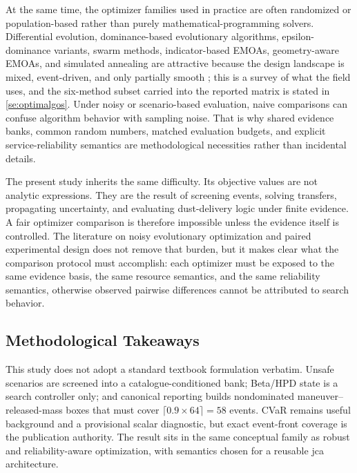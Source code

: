 At the same time, the optimizer families used in practice are often randomized or population-based rather than purely mathematical-programming solvers. Differential evolution, dominance-based evolutionary algorithms, epsilon-dominance variants, swarm methods, indicator-based EMOAs, geometry-aware EMOAs, and simulated annealing are attractive because the design landscape is mixed, event-driven, and only partially smooth \cite{StornPrice1997,deb2002nsgaii,laumanns2002epsilon,coello2002mopso,beume2007smsemoa,panichella2022agemoea2,kirkpatrick1983sa}; this is a survey of what the field uses, and the six-method subset carried into the reported matrix is stated in \cref{se:optimalgos}. Under noisy or scenario-based evaluation, naive comparisons can confuse algorithm behavior with sampling noise. That is why shared evidence banks, common random numbers, matched evaluation budgets, and explicit service-reliability semantics are methodological necessities rather than incidental details.

The present study inherits the same difficulty. Its objective values are not analytic expressions. They are the result of screening events, solving transfers, propagating uncertainty, and evaluating dust-delivery logic under finite evidence. A fair optimizer comparison is therefore impossible unless the evidence itself is controlled. The literature on noisy evolutionary optimization and paired experimental design does not remove that burden, but it makes clear what the comparison protocol must accomplish: each optimizer must be exposed to the same evidence basis, the same resource semantics, and the same reliability semantics, otherwise observed pairwise differences cannot be attributed to search behavior.

\subsection{Methodological Takeaways}
This study does not adopt a standard textbook formulation verbatim. Unsafe scenarios are screened into a catalogue-conditioned bank; Beta/HPD state is a search controller only; and canonical reporting builds nondominated maneuver--released-mass boxes that must cover \(\lceil0.9\times64\rceil=58\) events. CVaR remains useful background and a provisional scalar diagnostic, but exact event-front coverage is the publication authority. The result sits in the same conceptual family as robust and reliability-aware optimization, with semantics chosen for a reusable \gls{jca} architecture.

